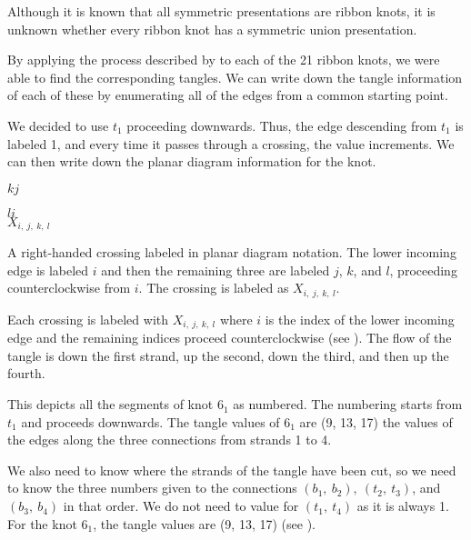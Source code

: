 \begin{paper}
Although it is known that all symmetric presentations are ribbon knots, it is
unknown whether every ribbon knot has a symmetric union presentation.


By applying the process described by \thmRibbon to each of the 21 ribbon knots,
we were able to find the corresponding tangles.
We can write down the tangle information of each of these by enumerating all of
the edges from a common starting point.

We decided to use $t_1$ proceeding downwards.
Thus, the edge descending from $t_1$ is labeled 1, and every time it passes
through a crossing, the value increments.
We can then write down the planar diagram information for the knot.

{\hspace{0.3in}\hspace{0.175\columnwidth}$k$\hspace{0.4\columnwidth}$j$
\begin{center}\end{center}

\hspace{0.3in}\hspace{0.175\columnwidth}$l$\hspace{0.4\columnwidth}$i$\\

\hspace{0.3in}\hspace{0.31\columnwidth}$X_{i,~j,~k,~l}$}
{A right-handed crossing labeled in planar diagram notation.
The lower incoming edge is labeled $i$ and then the remaining three are
labeled $j$, $k$, and $l$, proceeding counterclockwise from $i$.
The crossing is labeled as $X_{i,~j,~k,~l}$.}

Each crossing is labeled with $X_{i,~j,~k,~l}$ where $i$ is the index of the
lower incoming edge and the remaining indices proceed counterclockwise (see
\figCrossing).
The flow of the tangle is down the first strand, up the second, down the third,
and then up the fourth.

{This depicts all the segments of knot $6_1$ as numbered.
The numbering starts from $t_1$ and proceeds downwards.
The tangle values of $6_1$ are (9, 13, 17) the values of the edges along the
three connections from strands 1 to 4.}

We also need to know where the strands of the tangle have been cut, so we need
to know the three numbers given to the connections $(b_1,~b_2),~(t_2,~t_3)$, and
$(b_3,~b_4)$ in that order.
We do not need to value for $(t_1,~t_4)$ as it is always 1.
For the knot $6_1$, the tangle values are (9, 13, 17) (see \figExample).


\end{paper}
